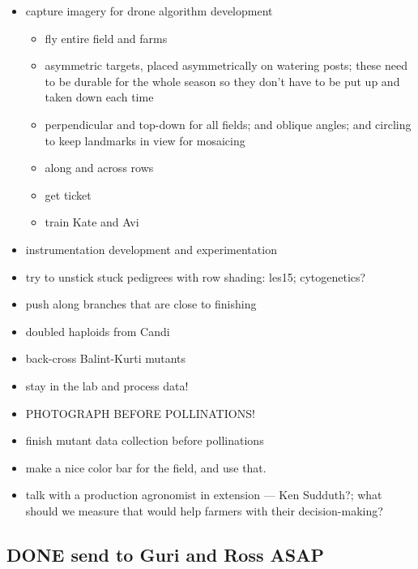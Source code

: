 \documentclass[11pt]{article}
\begin{document}
\begin{itemize}
\item capture imagery for drone algorithm development
\begin{itemize}
\item fly entire field and farms
\item asymmetric targets, placed asymmetrically on watering posts; these
need to be durable for the whole season so they don't have to be
put up and taken down each time
\item perpendicular and top-down for all fields; and oblique angles; and
circling to keep landmarks in view for mosaicing
\item along and across rows
\item get ticket
\item train Kate and Avi
\end{itemize}

\item instrumentation development and experimentation

\item try to unstick stuck pedigrees with row shading: les15; cytogenetics?

\item push along branches that are close to finishing

\item doubled haploids from Candi
\item back-cross Balint-Kurti mutants

\item stay in the lab and process data!

\item PHOTOGRAPH BEFORE POLLINATIONS!

\item finish mutant data collection before pollinations

\item make a nice color bar for the field, and use that.

\item talk with a production agronomist in extension --- Ken Sudduth?; what
should we measure that would help farmers with their decision-making?
\end{itemize}

\subsection{{\bfseries\sffamily DONE} send to Guri and Ross ASAP}
\label{sec-1-3}
\end{document}
